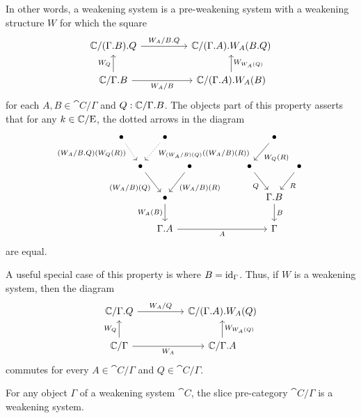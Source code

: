 \begin{rmk}
In other words, a weakening system is a pre-weakening system with a weakening
structure $W$ for which the square
\begin{equation*}
\begin{tikzcd}[column sep=huge]
\cat{C}/\ctxext{{\Gamma}{B}}{Q}
  \arrow[r,"W_A/\ctxext{B}{Q}"]
  &
\cat{C}/\ctxext{{\Gamma}{A}}{W_A(\ctxext{B}{Q})}
  \\
\cat{C}/\ctxext{\Gamma}{B}
  \arrow[u,"W_Q"]
  \arrow[r,swap,"W_A/B"]
  &
\cat{C}/\ctxext{{\Gamma}{A}}{W_A(B)}
  \arrow[u,swap,"W_{W_A(Q)}"]
\end{tikzcd}
\end{equation*}
for each $A,B\in\cat{C}/\Gamma$ and $Q:\cat{C}/\ctxext{\Gamma}{B}$. The objects part of this 
property asserts that for any $k\in \mathbb{C}/\mathrm{E}$, the dotted arrows in the diagram
\begin{equation*}
\begin{tikzcd}[column sep=tiny]
\bullet \arrow[dr,densely dotted,swap,near start,"(W_A/\ctxext{B}{Q})(W_Q(R))"] & & \bullet \arrow[dl,densely dotted,near start,"W_{(W_A/B)(Q)}((W_A/B)(R))"] & & & & & & & & & & \bullet \arrow[dl,"W_Q(R)"] \\
& \bullet \arrow[dr,swap,"(W_A/B)(Q)"] & & \bullet \arrow[dl,"(W_A/B)(R)"] & & & & & & & & \bullet \arrow[dr,swap,"Q"] & & \bullet \arrow[dl,"R"] \\
& & \bullet \arrow[d,swap,"W_A(B)"] & & & & & & & & & & \ctxext{\Gamma}{B} \arrow[d,"B"] \\
& & \ctxext{\Gamma}{A} \arrow[rrrrrrrrrr,swap,"A"] & & & & & & & & & & \Gamma
\end{tikzcd}
\end{equation*}
are equal.

A useful special case of this property is where $B={\mathrm{id}_{\Gamma}}$. Thus, if $W$ is
a weakening system, then the diagram
\begin{equation*}
\begin{tikzcd}[column sep=huge]
\cat{C}/\ctxext{\Gamma}{Q}
  \arrow[r,"W_A/Q"]
  &
\cat{C}/\ctxext{{\Gamma}{A}}{W_A(Q)}
  \\
\cat{C}/\Gamma
  \arrow[u,"W_Q"]
  \arrow[r,swap,"W_A"]
  &
\cat{C}/\ctxext{\Gamma}{A}
  \arrow[u,swap,"W_{W_A(Q)}"]
\end{tikzcd}
\end{equation*}
commutes for every $A\in\cat{C}/\Gamma$ and $Q\in\cat{C}/\Gamma$. 
\end{rmk}

\begin{cor}
For any object $\Gamma$ of a weakening system $\cat{C}$, the slice pre-category
$\cat{C}/\Gamma$ is a weakening system.
\end{cor}

